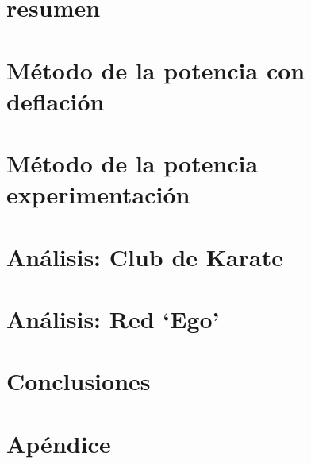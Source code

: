 


 



\section*{resumen}

\vspace{2em}

\tableofcontents
\newpage

\section{Método de la potencia con deflación}

\newpage


\section{Método de la potencia experimentación}

\newpage

\section{Análisis: Club de Karate}

\newpage

\section{Análisis: Red `Ego'}

\newpage

\section{Conclusiones}

\newpage

\section{Apéndice}

\newpage




